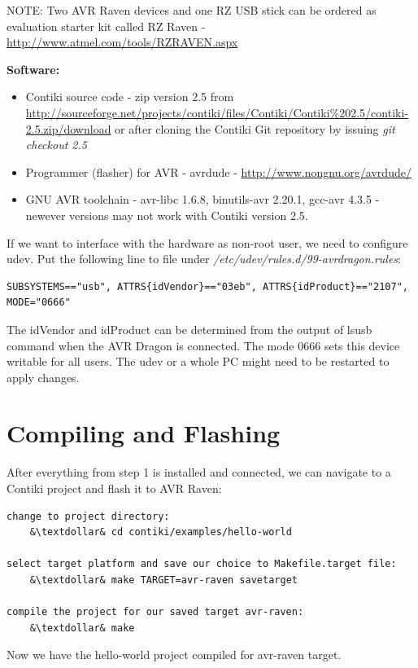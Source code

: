 \documentclass{article}
\begin{document}
NOTE: Two AVR Raven devices and one RZ USB stick can be ordered as
evaluation starter kit called RZ Raven - \url{http://www.atmel.com/tools/RZRAVEN.aspx}

\vspace{0.5cm}

{\textbf{Software:}}
\begin{itemize}
	\item Contiki source code - zip version 2.5 from\\
	\url{http://sourceforge.net/projects/contiki/files/Contiki/Contiki%202.5/contiki-2.5.zip/download}
	or after cloning the Contiki Git repository by issuing {\it{git checkout 2.5}}
	\item Programmer (flasher) for AVR - avrdude - \url{http://www.nongnu.org/avrdude/}
	\item GNU AVR toolchain - avr-libc 1.6.8, binutils-avr 2.20.1, gcc-avr 4.3.5 -
	newever versions may not work with Contiki version 2.5.
\end{itemize}

If we want to interface with the hardware as non-root user, we need to configure udev.
Put the following line to file under {\it{/etc/udev/rules.d/99-avrdragon.rules}}:
\begin{lstlisting}
SUBSYSTEMS=="usb", ATTRS{idVendor}=="03eb", ATTRS{idProduct}=="2107", MODE="0666"
\end{lstlisting}
The idVendor and idProduct can be determined from the output of lsusb command when the AVR Dragon is connected.
The mode 0666 sets this device writable for all users.
The udev or a whole PC might need to be restarted to apply changes.


\section{Compiling and Flashing}
After everything from step 1 is installed and connected, we can navigate to a Contiki project and flash it to AVR Raven:
\begin{lstlisting}
change to project directory:
	&\textdollar& cd contiki/examples/hello-world

select target platform and save our choice to Makefile.target file:
	&\textdollar& make TARGET=avr-raven savetarget

compile the project for our saved target avr-raven:
	&\textdollar& make
\end{lstlisting}
Now we have the hello-world project compiled for avr-raven target.
\end{document}
